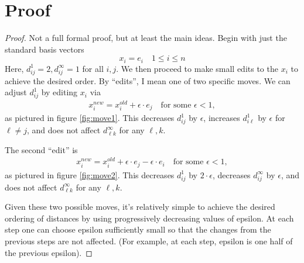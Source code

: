 \documentclass{article}[11pt]
\begin{document}
\section{Proof}
\begin{proof}
  Not a full formal proof, but at least the main ideas. Begin with just the standard basis vectors
  \[x_i = e_i \quad 1\leq i \leq n\]
  Here, $d_{ij}^1 = 2, d_{ij}^\infty = 1$ for all $i,j$. We then proceed to make small edits to the $x_i$ to achieve the desired order. By ``edits'', I mean one of two specific moves. We can adjust $d_{ij}^1$ by editing $x_i$ via
  \begin{align}\label{eqn:move1}
    x_i^{new} = x_i^{old} + \epsilon\cdot e_j\quad\text{for some }\epsilon < 1,
  \end{align}
  as pictured in figure \ref{fig:move1}. This decreases $d_{ij}^1$ by $\epsilon$, increases $d_{i\ell}^1$ by $\epsilon$ for $\ell \neq j$, and does not affect $d_{\ell k}^\infty$ for any $\ell, k$.

  The second ``edit'' is
  \begin{align}\label{eqn:move2}
    x_i^{new} = x_i^{old} + \epsilon\cdot e_j - \epsilon\cdot e_i \quad\text{for some }\epsilon < 1,
  \end{align}
  as pictured in figure \ref{fig:move2}. This decreases $d_{ij}^1$ by $2\cdot\epsilon$, decreases $d_{ij}^\infty$ by $\epsilon$, and does not affect $d_{\ell k}^\infty$ for any $\ell, k$.

  Given these two possible moves, it's relatively simple to achieve the desired ordering of distances by using progressively decreasing values of epsilon. At each step one can choose epsilon sufficiently small so that the changes from the previous steps are not affected. (For example, at each step, epsilon is one half of the previous epsilon).
  

\end{proof}
\end{document}
